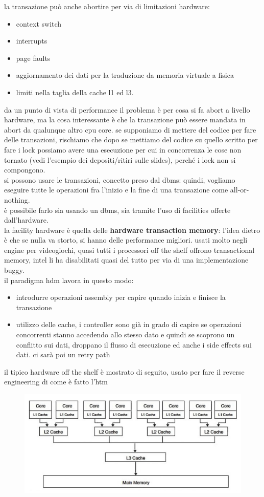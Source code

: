 \documentclass[12pt, oneside]{extbook} %
\begin{document}
la transazione può anche abortire per via di limitazioni hardware:
\begin{itemize}
	\item context switch
	\item interrupts
	\item page faults
	\item aggiornamento dei dati per la traduzione da memoria virtuale a fisica
	\item limiti nella taglia della cache l1 ed l3.
\end{itemize}
da un punto di vista di performance il problema è per cosa si fa abort a livello hardware, ma la cosa interessante è che la transazione può essere mandata in abort da qualunque altro cpu core.
se supponiamo di mettere del codice per fare delle transazioni, rischiamo che dopo se mettiamo del codice su quello scritto per fare i lock possiamo avere una esecuzione per cui in concorrenza le cose non tornato (vedi l'esempio dei depositi/ritiri sulle slides), perché i lock non si compongono.\\ si possono usare le transazioni, concetto preso dal dbms: quindi, vogliamo eseguire tutte le operazioni fra l'inizio e la fine di una transazione come all-or-nothing.\\è possibile farlo sia usando un dbms, sia tramite l'uso di facilities offerte dall'hardware.\\ la facility hardware è quella delle \textbf{hardware transaction memory}: l'idea dietro è che se nulla va storto, si hanno delle performance migliori. usati molto negli engine per videogiochi, quasi tutti i processori off the shelf offrono transactional memory, intel li ha disabilitati quasi del tutto per via di una implementazione buggy.\\ il paradigma hdm lavora in questo modo:
\begin{itemize}
\item introdurre operazioni assembly per capire quando inizia e finisce la transazione
\item utilizzo delle cache, i controller sono già in grado di capire se operazioni concorrenti stanno accedendo allo stesso dato e quindi se scoprono un conflitto sui dati, droppano il flusso di esecuzione ed anche i side effects sui dati. ci sarà poi un retry path
\end{itemize}
il tipico hardware off the shelf è mostrato di seguito, usato per fare il reverse engineering di come è fatto l'htm
\begin{figure}[!h]
	\includegraphics[scale=0.3]{immagini/htm_hw.png}
\end{figure}
\end{document}
